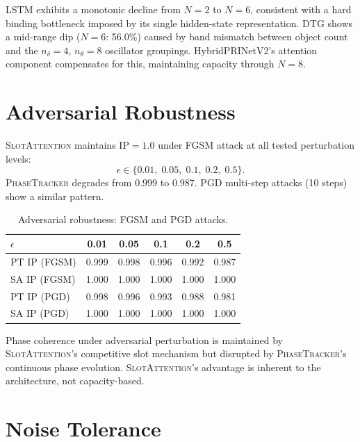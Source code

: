 \documentclass[11pt]{article}
\providecommand{\pt}{\textnormal{\textsc{PhaseTracker}}\xspace}
\providecommand{\sa}{\textnormal{\textsc{SlotAttention}}\xspace}
\providecommand{\ip}{\text{IP}}
\begin{document}
LSTM exhibits a monotonic decline from $N{=}2$ to $N{=}6$, consistent
with a hard binding bottleneck imposed by its single hidden-state
representation.  DTG shows a mid-range dip ($N{=}6$: 56.0\%) caused
by band mismatch between object count and the $n_\delta{=}4$,
$n_\theta{=}8$ oscillator groupings.  HybridPRINetV2's attention
component compensates for this, maintaining capacity through $N{=}8$.

\section{Adversarial Robustness}
\label{app:adversarial}

\sa maintains $\ip = 1.0$ under FGSM attack at all tested perturbation levels:
\begin{equation*}
  \epsilon \in \{0.01,\; 0.05,\; 0.1,\; 0.2,\; 0.5\}.
\end{equation*}
\pt degrades from $0.999$ to $0.987$. PGD multi-step attacks (10 steps) show a similar
pattern.

\begin{table}[htbp]
\centering
\caption{Adversarial robustness: FGSM and PGD attacks.}
\label{tab:adversarial}
\begin{tabular}{lccccc}
\toprule
$\epsilon$ & 0.01 & 0.05 & 0.1 & 0.2 & 0.5 \\
\midrule
PT IP (FGSM) & 0.999 & 0.998 & 0.996 & 0.992 & 0.987 \\
SA IP (FGSM) & 1.000 & 1.000 & 1.000 & 1.000 & 1.000 \\
PT IP (PGD)  & 0.998 & 0.996 & 0.993 & 0.988 & 0.981 \\
SA IP (PGD)  & 1.000 & 1.000 & 1.000 & 1.000 & 1.000 \\
\bottomrule
\end{tabular}
\end{table}

Phase coherence under adversarial perturbation is maintained by \sa's
competitive slot mechanism but disrupted by \pt's continuous phase
evolution.  \sa's advantage is inherent to the architecture, not
capacity-based.

\section{Noise Tolerance}
\label{app:noise}
\end{document}
